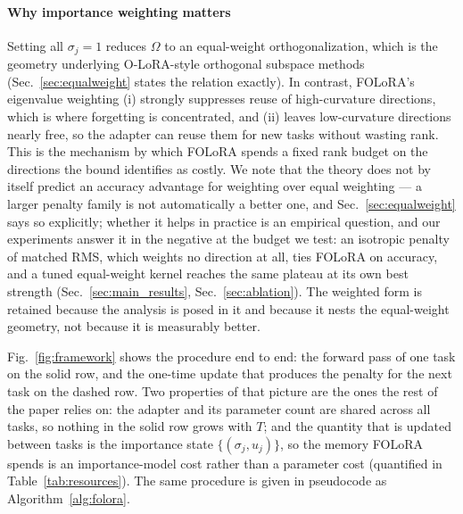 \paragraph{Why importance weighting matters}
Setting all $\sigma_j=1$ reduces $\Omega$ to an equal-weight orthogonalization, which is
the geometry underlying O-LoRA-style orthogonal subspace methods
(Sec.~\ref{sec:equalweight} states the relation exactly). In contrast, FOLoRA's
eigenvalue weighting (i) strongly suppresses reuse of high-curvature directions, which is
where forgetting is concentrated, and (ii) leaves low-curvature directions nearly free, so
the adapter can reuse them for new tasks without wasting rank. This is the mechanism by
which FOLoRA spends a fixed rank budget on the directions the bound identifies as costly.
We note that the theory does not by itself predict an accuracy advantage for weighting
over equal weighting --- a larger penalty family is not automatically a better one, and
Sec.~\ref{sec:equalweight} says so explicitly; whether it helps in practice is an
empirical question, and our experiments answer it in the negative at the budget we test:
an isotropic penalty of matched RMS, which weights no direction at all, ties FOLoRA on
accuracy, and a tuned equal-weight kernel reaches the same plateau at its own best
strength (Sec.~\ref{sec:main_results}, Sec.~\ref{sec:ablation}). The weighted form is retained
because the analysis is posed in it and because it nests the equal-weight geometry, not
because it is measurably better.



Fig.~\ref{fig:framework} shows the procedure end to end: the forward pass of one task on
the solid row, and the one-time update that produces the penalty for the next task on the
dashed row. Two properties of that picture are the ones the rest of the paper relies on:
the adapter and its parameter count are shared across all tasks, so nothing in the solid
row grows with $T$; and the quantity that is updated between tasks is the importance state
$\{(\sigma_j,u_j)\}$, so the memory FOLoRA spends is an importance-model cost rather than a
parameter cost (quantified in Table~\ref{tab:resources}). The same procedure is given in
pseudocode as Algorithm~\ref{alg:folora}.

